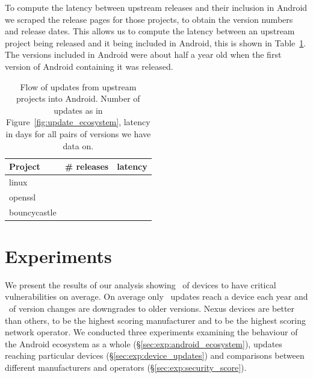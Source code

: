 \documentclass[conference,a4paper,twoside]{IEEEtran}
\let\OldTodo\todo
\renewcommand{\todo}{\OldTodo[inline]}
\newcommand{\todolater}[1]{}%
\begin{document}
To compute the latency between upstream releases and their inclusion in Android we scraped the release pages for those projects, to obtain the version numbers and release dates.
This allows us to compute the latency between an upstream project being released and it being included in Android, this is shown in Table~\ref{tab:update_ecosystem}.
The versions included in Android were about half a year old when the first version of Android containing it was released.
\begin{table}
\centering
\begin{tabular}{l|r|r}
Project	&	\# releases	&	latency \\ \hline
linux	&	\linuxNumVersions	&	\linuxMeanUpdateLatency \\
openssl	&	\opensslNumVersions	&	\opensslMeanUpdateLatency \\
bouncycastle	&	\bouncycastleNumVersions	&	\bouncycastleMeanUpdateLatency \\
\end{tabular}
\caption{Flow of updates from upstream projects into Android. Number of updates as in Figure~\ref{fig:update_ecosystem}, latency in days for all pairs of versions we have data on.\todolater{scrape the other 26 websites... is it worth it?}}
\label{tab:update_ecosystem}
\end{table}






\section{Experiments}
\label{sec:results}
We present the results of our analysis showing \daMeanInsecurityPerc\ of devices to have critical vulnerabilities on average.
On average only \daUpdatesPerYear\ updates reach a device each year and \daPercUpdatesDowngrades\ of version changes are downgrades to older versions.
Nexus devices are better than others, \emph{\daSecScoreBestmanufacturer} to be the highest scoring manufacturer and \emph{\daSecScoreBestoperator} to be the highest scoring network operator.
We conducted three experiments examining the behaviour of the Android ecosystem as a whole (\S\ref{sec:exp:android_ecosystem}), updates reaching particular devices (\S\ref{sec:exp:device_updates}) and comparisons between different manufacturers and operators (\S\ref{sec:exp:security_score}).
\end{document}
